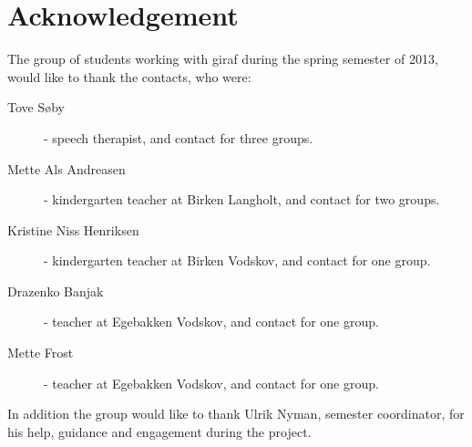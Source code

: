 \section{Acknowledgement}
The group of students working with \ac{giraf} during the spring semester of 2013, would like to thank the contacts, who were:

\begin{description}
\item [Tove S{\o}by] - speech therapist, and contact for three groups.
\item [Mette Als Andreasen] - kindergarten teacher at Birken Langholt, and contact for two groups.
\item [Kristine Niss Henriksen] - kindergarten teacher at Birken Vodskov, and contact for one group.
\item [Drazenko Banjak] - teacher at Egebakken Vodskov, and contact for one group.
\item [Mette Frost] - teacher at Egebakken Vodskov, and contact for one group.
\end{description}

In addition the group would like to thank Ulrik Nyman, semester coordinator, for his help, guidance and engagement during the project.
